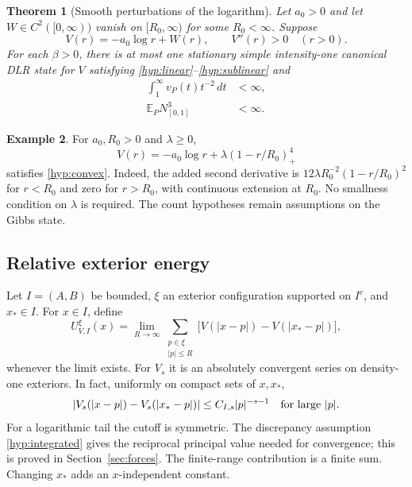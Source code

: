 \documentclass[11pt,reqno]{amsart}
\numberwithin{equation}{section}
\newtheorem{theorem}{Theorem}[section]
\theoremstyle{definition}
\newtheorem{example}[theorem]{Example}
\newcommand{\E}{\mathbb E}
\newcommand{\1}{\mathbf 1}
\newcommand{\dd}{\,d}
\newcommand{\abs}[1]{\left|#1\right|}
\begin{document}
\begin{theorem}[Smooth perturbations of the logarithm]\label{thm:perturb}
Let $a_0>0$ and let $W\in C^2([0,\infty))$ vanish on $[R_0,\infty)$
for some $R_0<\infty$. Suppose
\begin{equation}\label{hyp:convex}
V(r)=-a_0\log r+W(r),\qquad V''(r)>0\quad(r>0).
\end{equation}
For each $\beta>0$, there is at most one stationary simple
intensity-one canonical DLR state for $V$ satisfying
\eqref{hyp:linear}--\eqref{hyp:sublinear} and
\begin{align}
\int_1^\infty v_P(t)t^{-2}\dd t&<\infty,\label{hyp:integrated}\\
\E_PN_{[0,1]}^3&<\infty.\label{hyp:third}
\end{align}
\end{theorem}

\begin{example}\label{ex:compact}
For $a_0,R_0>0$ and $\lambda\ge0$,
\[
V(r)=-a_0\log r+\lambda(1-r/R_0)_+^4
\]
satisfies \eqref{hyp:convex}. Indeed, the added second derivative is
$12\lambda R_0^{-2}(1-r/R_0)^2$ for $r<R_0$ and zero for $r>R_0$,
with continuous extension at $R_0$. No smallness condition on $\lambda$
is required. The count hypotheses remain assumptions on the Gibbs state.
\end{example}

\subsection{Relative exterior energy}
Let $I=(A,B)$ be bounded, $\xi$ an exterior configuration supported on
$I^c$, and $x_*\in I$. For $x\in I$, define
\begin{equation}\label{def:exterior}
U_{V,I}^{\xi}(x)=
\lim_{R\to\infty}\sum_{\substack{p\in\xi\\ |p|\le R}}
\bigl[V(|x-p|)-V(|x_*-p|)\bigr],
\end{equation}
whenever the limit exists. For $V_s$ it is an absolutely convergent
series on density-one exteriors. In fact, uniformly on compact sets of
$x,x_*$,
\begin{equation}\label{eq:relative-riesz-tail}
\abs{V_s(|x-p|)-V_s(|x_*-p|)}
\le C_{I,s}|p|^{-s-1}\quad\hbox{for large }|p|.
\end{equation}
For a logarithmic tail the cutoff is symmetric. The discrepancy
assumption \eqref{hyp:integrated} gives the reciprocal principal value
needed for convergence; this is proved in
Section~\ref{sec:forces}. The finite-range contribution is a finite sum.
Changing $x_*$ adds an $x$-independent constant.
\end{document}
